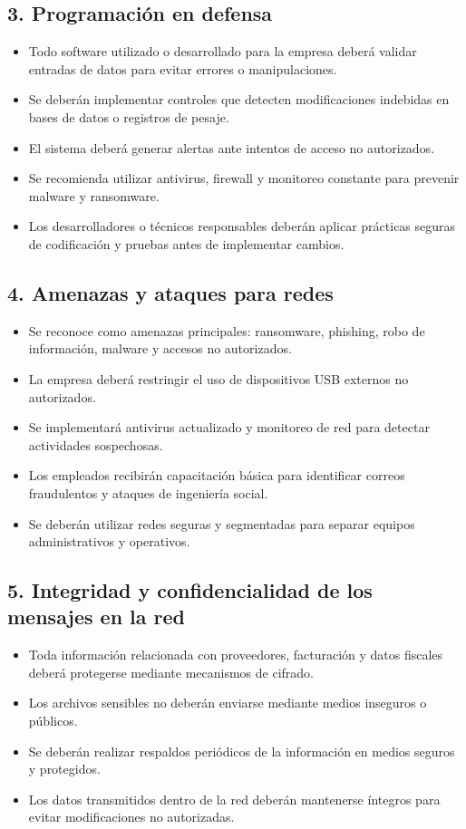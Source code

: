 \subsection*{3. Programación en defensa}
\begin{itemize}
    \item Todo software utilizado o desarrollado para la empresa deberá validar entradas de datos para evitar errores o manipulaciones.
    \item Se deberán implementar controles que detecten modificaciones indebidas en bases de datos o registros de pesaje.
    \item El sistema deberá generar alertas ante intentos de acceso no autorizados.
    \item Se recomienda utilizar antivirus, firewall y monitoreo constante para prevenir malware y ransomware.
    \item Los desarrolladores o técnicos responsables deberán aplicar prácticas seguras de codificación y pruebas antes de implementar cambios.
\end{itemize}

\subsection*{4. Amenazas y ataques para redes}
\begin{itemize}
    \item Se reconoce como amenazas principales: ransomware, phishing, robo de información, malware y accesos no autorizados.
    \item La empresa deberá restringir el uso de dispositivos USB externos no autorizados.
    \item Se implementará antivirus actualizado y monitoreo de red para detectar actividades sospechosas.
    \item Los empleados recibirán capacitación básica para identificar correos fraudulentos y ataques de ingeniería social.
    \item Se deberán utilizar redes seguras y segmentadas para separar equipos administrativos y operativos.
\end{itemize}

\subsection*{5. Integridad y confidencialidad de los mensajes en la red}
\begin{itemize}
    \item Toda información relacionada con proveedores, facturación y datos fiscales deberá protegerse mediante mecanismos de cifrado.
    \item Los archivos sensibles no deberán enviarse mediante medios inseguros o públicos.
    \item Se deberán realizar respaldos periódicos de la información en medios seguros y protegidos.
    \item Los datos transmitidos dentro de la red deberán mantenerse íntegros para evitar modificaciones no autorizadas.
\end{itemize}

